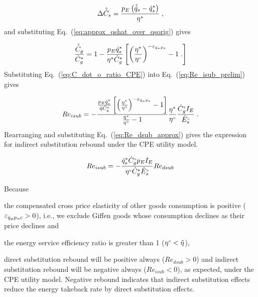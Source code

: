 \begin{equation}
  \Delta \hat{\dot{C}}_s = \frac{p_E \left( \hat{\dot{q}}_s - {\dot{q}}^*_s \right)}{{\eta}^*} \; ,
\end{equation}
%
and
substituting Eq.~(\ref{eq:approx_qshat_over_qsorig}) gives

\begin{equation} \label{eq:C_dot_o_ratio_CPE}
  \frac{\hat{\dot{C}}_g}{{\dot{C}}^*_g} = 1 - \frac{p_E {\dot{q}}^*_s}{{\eta}^*  {\dot{C}}^*_g} \left[ \left( \frac{{\eta}^*}{{}{\eta}^{\scriptscriptstyle \circ}} \right)^{-\varepsilon_{\dot{q}_s\!,p_s}} - 1 \; . \right]
\end{equation}
%
Substituting Eq.~(\ref{eq:C_dot_o_ratio_CPE})
into Eq.~(\ref{eq:Re_isub_prelim}) gives

\begin{equation}
  Re_{isub} = - \frac{\frac{p_E {\dot{q}}^*_s}{\tilde{\eta} {\dot{C}}^*_g}
                   \left[ \left( \frac{{\eta}^*}{{}{\eta}^{\scriptscriptstyle \circ}} \right)^{-\varepsilon_{\dot{q}_s\!,p_s}} - 1   \right] }
                {\frac{{\eta}^*}{{}{\eta}^{\scriptscriptstyle \circ}} - 1}
                \frac{{\eta}^*}{{}{\eta}^{\scriptscriptstyle \circ}}
                \frac{{}{\dot{C}}^{\scriptscriptstyle \circ}_g I_E}{{}{\dot{E}}^{\scriptscriptstyle \circ}_s} \; .
\end{equation}
%
Rearranging and substituting Eq.~(\ref{eq:Re_dsub_approx}) gives
the expression for indirect substitution rebound under the
CPE utility model.

\begin{equation} \label{eq:Re_isub_cpe}
  Re_{isub} = - \frac{{\dot{q}}^*_s {}{\dot{C}}^{\scriptscriptstyle \circ}_g p_E I_E}{{}{\eta}^{\scriptscriptstyle \circ} {\dot{C}}^*_g {}{\dot{E}}^{\scriptscriptstyle \circ}_s} Re_{dsub}
\end{equation}

Because %
\begin{enumerate*}[label={(\roman*)}]

  \item the compensated cross price elasticity
        of other goods consumption is positive ($\varepsilon_{\dot{q}_g\!,p_s\!,c} > 0$),
        i.e., we exclude Giffen goods
        \citep{Spiegel:1994aa}
        whose consumption declines
        as their price declines and

  \item the energy service efficiency ratio is greater than 1
        (${}{\eta}^{\scriptscriptstyle \circ} < \tilde{\eta}$),

\end{enumerate*}
%
direct substitution rebound will be positive always
($Re_{dsub} > 0$) and
indirect substitution rebound will be negative always
($Re_{isub} < 0$),
as expected, under the CPE utility model.
Negative rebound indicates that indirect substitution effects
reduce the energy takeback rate by direct substitution effects.


